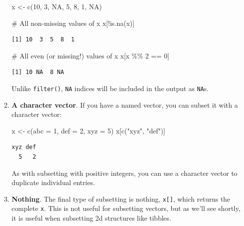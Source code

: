\documentclass[
  letterpaper,
  DIV=11,
  numbers=noendperiod]{scrreprt}
\newenvironment{Shaded}{\begin{snugshade}}{\end{snugshade}}
\newcommand{\AttributeTok}[1]{\textcolor[rgb]{0.40,0.45,0.13}{#1}}
\newcommand{\CommentTok}[1]{\textcolor[rgb]{0.37,0.37,0.37}{#1}}
\newcommand{\ConstantTok}[1]{\textcolor[rgb]{0.56,0.35,0.01}{#1}}
\newcommand{\DecValTok}[1]{\textcolor[rgb]{0.68,0.00,0.00}{#1}}
\newcommand{\FunctionTok}[1]{\textcolor[rgb]{0.28,0.35,0.67}{#1}}
\newcommand{\NormalTok}[1]{\textcolor[rgb]{0.00,0.23,0.31}{#1}}
\newcommand{\OtherTok}[1]{\textcolor[rgb]{0.00,0.23,0.31}{#1}}
\newcommand{\SpecialCharTok}[1]{\textcolor[rgb]{0.37,0.37,0.37}{#1}}
\newcommand{\StringTok}[1]{\textcolor[rgb]{0.13,0.47,0.30}{#1}}
\begin{document}
\begin{enumerate}
\begin{Shaded}
\begin{Highlighting}[]
\NormalTok{x }\OtherTok{\textless{}{-}} \FunctionTok{c}\NormalTok{(}\DecValTok{10}\NormalTok{, }\DecValTok{3}\NormalTok{, }\ConstantTok{NA}\NormalTok{, }\DecValTok{5}\NormalTok{, }\DecValTok{8}\NormalTok{, }\DecValTok{1}\NormalTok{, }\ConstantTok{NA}\NormalTok{)}

\CommentTok{\# All non{-}missing values of x}
\NormalTok{x[}\SpecialCharTok{!}\FunctionTok{is.na}\NormalTok{(x)]}
\end{Highlighting}
\end{Shaded}

\begin{verbatim}
[1] 10  3  5  8  1
\end{verbatim}

\begin{Shaded}
\begin{Highlighting}[]
\CommentTok{\# All even (or missing!) values of x}
\NormalTok{x[x }\SpecialCharTok{\%\%} \DecValTok{2} \SpecialCharTok{==} \DecValTok{0}\NormalTok{]}
\end{Highlighting}
\end{Shaded}

\begin{verbatim}
[1] 10 NA  8 NA
\end{verbatim}

  Unlike \texttt{filter()}, \texttt{NA} indices will be included in the
  output as \texttt{NA}s.
\item
  \textbf{A character vector}. If you have a named vector, you can
  subset it with a character vector:

\begin{Shaded}
\begin{Highlighting}[]
\NormalTok{x }\OtherTok{\textless{}{-}} \FunctionTok{c}\NormalTok{(}\AttributeTok{abc =} \DecValTok{1}\NormalTok{, }\AttributeTok{def =} \DecValTok{2}\NormalTok{, }\AttributeTok{xyz =} \DecValTok{5}\NormalTok{)}
\NormalTok{x[}\FunctionTok{c}\NormalTok{(}\StringTok{"xyz"}\NormalTok{, }\StringTok{"def"}\NormalTok{)]}
\end{Highlighting}
\end{Shaded}

\begin{verbatim}
xyz def 
  5   2 
\end{verbatim}

  As with subsetting with positive integers, you can use a character
  vector to duplicate individual entries.
\item
  \textbf{Nothing}. The final type of subsetting is nothing,
  \texttt{x{[}{]}}, which returns the complete \texttt{x}. This is not
  useful for subsetting vectors, but as we'll see shortly, it is useful
  when subsetting 2d structures like tibbles.
\end{enumerate}
\end{document}
